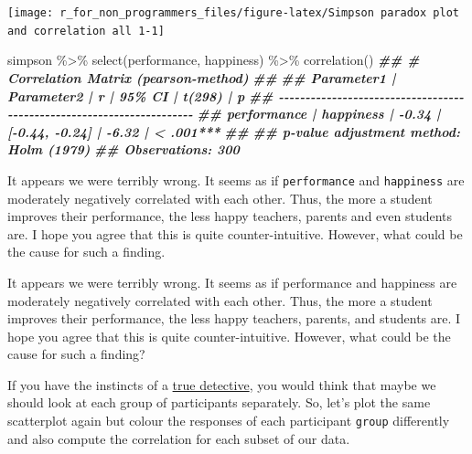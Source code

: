\documentclass[
]{book}
\newenvironment{Shaded}{\begin{snugshade}}{\end{snugshade}}
\newcommand{\DocumentationTok}[1]{\textcolor[rgb]{0.56,0.35,0.01}{\textbf{\textit{#1}}}}
\newcommand{\FunctionTok}[1]{\textcolor[rgb]{0.00,0.00,0.00}{#1}}
\newcommand{\NormalTok}[1]{#1}
\newcommand{\SpecialCharTok}[1]{\textcolor[rgb]{0.00,0.00,0.00}{#1}}
\begin{document}
\begin{center}\texttt{[image: r\_for\_non\_programmers\_files/figure-latex/Simpson paradox plot and correlation all 1-1]} \end{center}

\begin{Shaded}
\begin{Highlighting}[]
\NormalTok{simpson }\SpecialCharTok{\%\textgreater{}\%}
  \FunctionTok{select}\NormalTok{(performance, happiness) }\SpecialCharTok{\%\textgreater{}\%}
  \FunctionTok{correlation}\NormalTok{()}
\DocumentationTok{\#\# \# Correlation Matrix (pearson{-}method)}
\DocumentationTok{\#\# }
\DocumentationTok{\#\# Parameter1  | Parameter2 |     r |         95\% CI | t(298) |         p}
\DocumentationTok{\#\# {-}{-}{-}{-}{-}{-}{-}{-}{-}{-}{-}{-}{-}{-}{-}{-}{-}{-}{-}{-}{-}{-}{-}{-}{-}{-}{-}{-}{-}{-}{-}{-}{-}{-}{-}{-}{-}{-}{-}{-}{-}{-}{-}{-}{-}{-}{-}{-}{-}{-}{-}{-}{-}{-}{-}{-}{-}{-}{-}{-}{-}{-}{-}{-}{-}{-}{-}{-}{-}{-}}
\DocumentationTok{\#\# performance |  happiness | {-}0.34 | [{-}0.44, {-}0.24] |  {-}6.32 | \textless{} .001***}
\DocumentationTok{\#\# }
\DocumentationTok{\#\# p{-}value adjustment method: Holm (1979)}
\DocumentationTok{\#\# Observations: 300}
\end{Highlighting}
\end{Shaded}

It appears we were terribly wrong. It seems as if \texttt{performance} and \texttt{happiness} are moderately negatively correlated with each other. Thus, the more a student improves their performance, the less happy teachers, parents and even students are. I hope you agree that this is quite counter-intuitive. However, what could be the cause for such a finding.

It appears we were terribly wrong. It seems as if performance and happiness are moderately negatively correlated with each other. Thus, the more a student improves their performance, the less happy teachers, parents, and students are. I hope you agree that this is quite counter-intuitive. However, what could be the cause for such a finding?

If you have the instincts of a \href{https://www.imdb.com/title/tt2356777/episodes?season=1}{true detective}, you would think that maybe we should look at each group of participants separately. So, let's plot the same scatterplot again but colour the responses of each participant \texttt{group} differently and also compute the correlation for each subset of our data.
\end{document}
